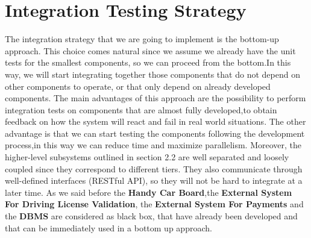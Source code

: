 \section{Integration Testing Strategy}
The integration strategy that we are going to implement is the bottom-up approach. This choice
comes natural since we assume we already have the unit tests for the smallest
components, so we can proceed from the bottom.In this way, we will start integrating together those components that do not depend on other components to operate, or that
only depend on already developed components. The main advantages of this approach are the possibility to perform integration tests on components that are almost fully developed,to obtain feedback on how the system will react and fail in real world situations. The other advantage is that we can start testing the components following the development process,in this way we can reduce time and maximize parallelism.
Moreover, the higher-level subsystems outlined in section 2.2 are well
separated and loosely coupled since they correspond to different tiers. They
also communicate through well-defined interfaces (RESTful API), so
they will not be hard to integrate at a later time.
As we said before the \textbf{Handy Car Board},the \textbf{External System For Driving License Validation}, the \textbf{External System For Payments} and the \textbf{DBMS} are considered as black box, that have already been developed and that can be immediately used in a bottom up approach.

